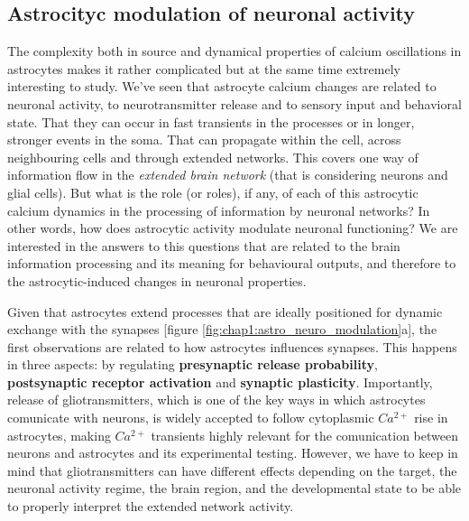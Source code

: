 \subsection{Astrocityc modulation of neuronal activity}
\label{chap1:sec:2:subsec3:astro_neuromodulation}
The complexity both in source and dynamical properties of calcium oscillations in astrocytes makes it rather complicated but at the same time extremely interesting to study.
We've seen that astrocyte calcium changes are related to neuronal activity, to neurotransmitter release and to sensory input and behavioral state.
That they can occur in fast transients in the processes or in longer, stronger events in the soma. 
That can propagate within the cell, across neighbouring cells and through extended networks.
This covers one way of information flow in the \textit{extended brain network} (that is considering neurons and glial cells). 
But what is the role (or roles), if any, of each of this astrocytic calcium dynamics in the processing of information by neuronal networks?
In other words, how does astrocytic activity modulate neuronal functioning?
We are interested in the answers to this questions that are related to the brain information processing and its meaning for behavioural outputs, and therefore to the astrocytic-induced changes in neuronal properties. 

Given that astrocytes extend processes that are ideally positioned for dynamic exchange with the synapses [figure \ref{fig:chap1:astro_neuro_modulation}a], the first observations are related to how astrocytes influences synapses. 
This happens in three aspects: by regulating \textbf{presynaptic release probability}, \textbf{postsynaptic receptor activation} and \textbf{synaptic plasticity}.
Importantly, release of gliotransmitters, which is one of the key ways in which astrocytes comunicate with neurons, is widely accepted to follow cytoplasmic $Ca^{2+}$ rise in astrocytes, making $Ca^{2+}$ transients highly relevant for the comunication between neurons and astrocytes and its experimental testing.
However, we have to keep in mind that gliotransmitters can have different effects depending on the target, the neuronal activity regime, the brain region, and the developmental state to be able to properly interpret the extended network activity. 

